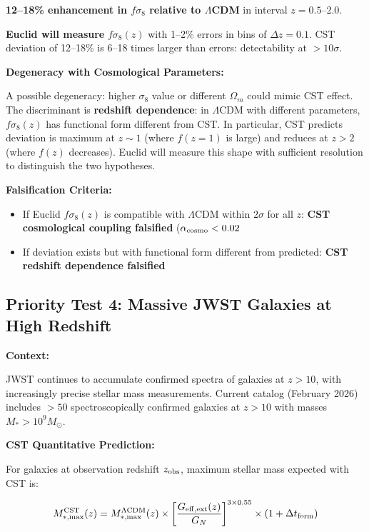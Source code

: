 \documentclass[10pt,a4paper]{article}
\providecommand{\tightlist}{\setlength{\itemsep}{0pt}\setlength{\parskip}{0pt}}
\begin{document}
\textbf{12--18\% enhancement in \(f\sigma_8\) relative to
\(\Lambda\)CDM} in interval \(z = 0.5\)--2.0.

\textbf{Euclid will measure} \(f\sigma_8(z)\) with 1--2\% errors in bins
of \(\Delta z = 0.1\). CST deviation of 12--18\% is 6--18 times larger
than errors: detectability at \(> 10\sigma\).

\textbf{Degeneracy with Cosmological Parameters:}

A possible degeneracy: higher \(\sigma_8\) value or different
\(\Omega_m\) could mimic CST effect. The discriminant is
\textbf{redshift dependence}: in \(\Lambda\)CDM with different
parameters, \(f\sigma_8(z)\) has functional form different from CST. In
particular, CST predicts deviation is maximum at \(z \sim 1\) (where
\(f(z=1)\) is large) and reduces at \(z > 2\) (where \(f(z)\)
decreases). Euclid will measure this shape with sufficient resolution to
distinguish the two hypotheses.

\textbf{Falsification Criteria:}

\begin{itemize}
\tightlist
\item
  If Euclid \(f\sigma_8(z)\) is compatible with \(\Lambda\)CDM within
  \(2\sigma\) for all \(z\): \textbf{CST cosmological coupling
  falsified} (\(\alpha_{\rm cosmo} < 0.02\)
\item
  If deviation exists but with functional form different from predicted:
  \textbf{CST redshift dependence falsified}
\end{itemize}

\subsection{Priority Test 4: Massive JWST Galaxies at High
Redshift}\label{priority-test-4-massive-jwst-galaxies-at-high-redshift}

\textbf{Context:}

JWST continues to accumulate confirmed spectra of galaxies at
\(z > 10\), with increasingly precise stellar mass measurements. Current
catalog (February 2026) includes \(> 50\) spectroscopically confirmed
galaxies at \(z > 10\) with masses \(M_* > 10^9 M_\odot\).

\textbf{CST Quantitative Prediction:}

For galaxies at observation redshift \(z_{\rm obs}\), maximum stellar
mass expected with CST is:

\[M_{*,\rm max}^{\rm CST}(z) = M_{*,\rm max}^{\Lambda{\rm CDM}}(z) \times \left[\frac{G_{\rm eff,ext}(z)}{G_N}\right]^{3 \times 0.55} \times \left(1 + \Delta t_{\rm form}\right)\]
\end{document}
